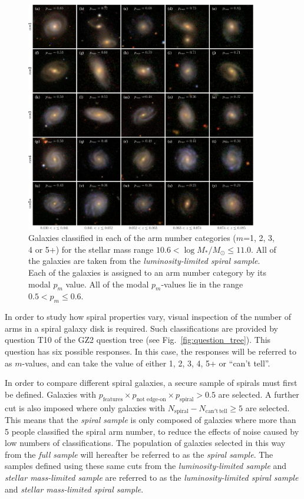 \documentclass[useAMS,usenatbib]{mn2e}
\begin{document}
\begin{figure}
		\centering

        \includegraphics[width=0.9\textwidth]{Images/Results/image_page_p0506_m106110.pdf}

        \caption{Galaxies classified in each of the arm number categories ($m$=1, 2, 3, 4 or 5+) for the stellar mass range $10.6 < \log{M_*/M_{\odot}} \leq 11.0$. All of the galaxies are taken from the \textit{luminosity-limited spiral sample}. Each of the galaxies is assigned to an arm number category by its modal $p_m$ value. All of the modal $p_m$-values lie in the range $0.5 < p_m \leq 0.6$.}

        \label{fig:image_panel}

\end{figure}

In order to study how spiral properties vary, visual inspection of the number of arms in a spiral galaxy disk is required. Such classifications are provided by question T10 of the GZ2 question tree (see Fig.~\ref{fig:question_tree}). This question has six possible responses. In this case, the responses will be referred to as $m$-values, and can take the value of either 1, 2, 3, 4, 5+ or ``can't tell''.

In order to compare different spiral galaxies, a secure sample of spirals must first be defined. Galaxies with $p_{\textrm{features}} \times p_{\textrm{not edge-on}} \times p_{\textrm{spiral}} > 0.5$ are selected. A further cut is also imposed where only galaxies with $N_\mathrm{spiral} - N_\mathrm{can't \, tell} \geq 5$ are selected. This means that the \textit{spiral sample} is only composed of galaxies where more than 5 people classified the spiral arm number, to reduce the effects of noise caused by low numbers of classifications. The population of galaxies selected in this way from the \textit{full sample} will hereafter be referred to as the \textit{spiral sample}. The samples defined using these same cuts from the \textit{luminosity-limited sample} and \textit{stellar mass-limited sample} are referred to as the \textit{luminosity-limited spiral sample} and \textit{stellar mass-limited spiral sample}.
\end{document}
